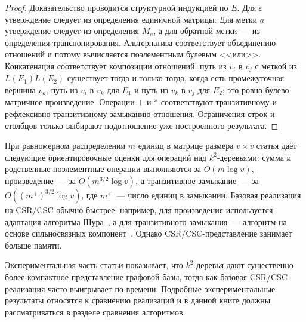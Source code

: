\begin{proof}
    Доказательство проводится структурной индукцией по $E$. Для $\varepsilon$ утверждение следует из определения единичной матрицы. Для метки $a$ утверждение следует из определения $M_a$, а для обратной метки~--- из определения транспонирования. Альтернатива соответствует объединению отношений и потому вычисляется поэлементным булевым <<или>>. Конкатенация соответствует композиции отношений: путь из $v_i$ в $v_j$ с меткой из $L(E_1)L(E_2)$ существует тогда и только тогда, когда есть промежуточная вершина $v_k$, путь из $v_i$ в $v_k$ для $E_1$ и путь из $v_k$ в $v_j$ для $E_2$; это ровно булево матричное произведение. Операции $+$ и $*$ соответствуют транзитивному и рефлексивно-транзитивному замыканию отношения. Ограничения строк и столбцов только выбирают подотношение уже построенного результата.
\end{proof}

При равномерном распределении $m$ единиц в матрице размера $v \times v$ статья даёт следующие ориентировочные оценки для операций над $k^2$-деревьями: сумма и родственные поэлементные операции выполняются за $O(m\log v)$, произведение~--- за $O(m^{3/2}\log v)$, а транзитивное замыкание~--- за $O((m^+)^{3/2}\log v)$, где $m^+$~--- число единиц в замыкании. Базовая реализация на CSR/CSC обычно быстрее: например, для произведения используется адаптация алгоритма Шура~, а для транзитивного замыкания~--- алгоритм на основе сильносвязных компонент~. Однако CSR/CSC-представление занимает больше памяти.

Экспериментальная часть статьи показывает, что $k^2$-деревья дают существенно более компактное представление графовой базы, тогда как базовая CSR/CSC-реализация часто выигрывает по времени. Подробные экспериментальные результаты относятся к сравнению реализаций и в данной книге должны рассматриваться в разделе сравнения алгоритмов.
